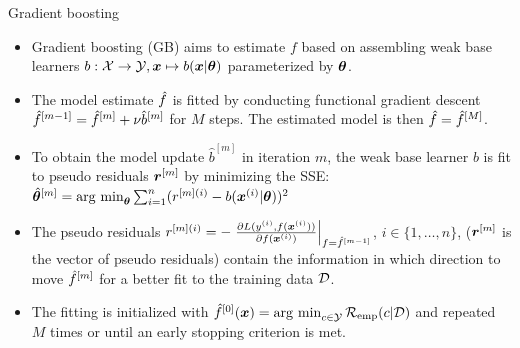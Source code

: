 \documentclass[10pt]{beamer}
\begin{document}
\begin{frame}{Gradient boosting}
  \begin{itemize}
    \item
      Gradient boosting (GB) aims to estimate $f$ based on assembling weak base learners $b:\mathcal{X} \to \mathcal{Y}, \bm{x} \mapsto b(\bm{x} | \bm{\theta})$ parameterized by $\bm{\theta}$.

    \item
      The model estimate $\hat{f}$ is fitted by conducting functional gradient descent $\hat{f}^{[m-1]} = \hat{f}^{[m]} + \nu \hat{b}^{[m]}$ for $M$ steps. The estimated model is then $\hat{f} = \hat{f}^{[M]}$.

    \item
      To obtain the model update $\hat{b}^{[m]}$ in iteration $m$, the weak base learner $b$ is fit to pseudo residuals $\bm{r}^{[m]}$ by minimizing the SSE: $\hat{\bm{\theta}}^{[m]} = \operatorname{arg~min}_{\bm{\theta}} \sum_{i=1}^n(r^{[m](i)} - b(\bm{x}^{(i)} | \bm{\theta}))^2$

    \item
      The pseudo residuals $r^{[m](i)} = -\left.\frac{\partial L(y^{(i)}, f(\bm{x}^{(i)}))}{\partial f(\bm{x}^{(i)})}\right|_{f = \hat{f}^{[m-1]}}$, $i \in \{1, \dots, n\}$, ($\bm{r}^{[m]}$ is the vector of pseudo residuals) contain the information in which direction to move $\hat{f}^{[m]}$ for a better fit to the training data $\mathcal{D}$.

    \item
      The fitting is initialized with $\hat{f}^{[0]}(\bm{x}) = \operatorname{arg~min}_{c\in\mathcal{Y}}\mathcal{R}_{\text{emp}}(c|\mathcal{D})$ and repeated $M$ times or until an early stopping criterion is met.
  \end{itemize}
\end{frame}
\end{document}
